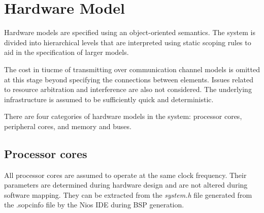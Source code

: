 \documentclass{article}
\begin{document}
\section{Hardware Model}
Hardware models are specified using an object-oriented semantics. The system is divided into hierarchical levels that are interpreted using static scoping rules to aid in the specification of larger models. 

The cost in tiucme of transmitting over communication channel models is omitted at this stage beyond specifying the connections between elements. Issues related to resource arbitration and interference are also not considered. The underlying infrastructure is assumed to be sufficiently quick and deterministic.

There are four categories of hardware models in the system: processor cores, peripheral cores, and memory and buses.

\subsection{Processor cores}
All processor cores are assumed to operate at the same clock frequency. Their parameters are determined during hardware design and are not altered during software mapping. They can be extracted from the \emph{system.h} file generated from the {.sopcinfo} file by the Nios IDE during BSP generation.
\end{document}
